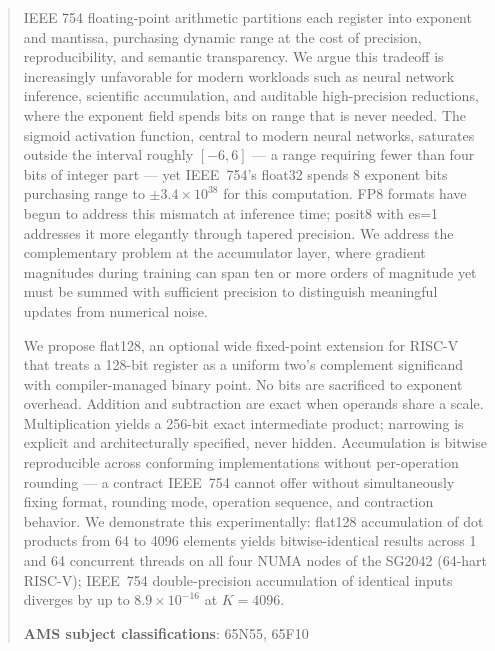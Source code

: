 \documentclass[runningheads]{llncs}
\begin{document}
\begin{abstract}
IEEE 754 floating-point arithmetic partitions each register into exponent
and mantissa, purchasing dynamic range at the cost of precision,
reproducibility, and semantic transparency. We argue this tradeoff is
increasingly unfavorable for modern workloads such as neural network
inference, scientific accumulation, and auditable high-precision
reductions, where the exponent field spends bits on range that is never
needed. The sigmoid activation function, central to modern neural
networks, saturates outside the interval roughly $[-6, 6]$ --- a range
requiring fewer than four bits of integer part --- yet IEEE~754's
float32 spends 8 exponent bits purchasing range to $\pm3.4\times10^{38}$
for this computation. FP8 formats have begun to address this mismatch at
inference time; posit8 with es=1 addresses it more elegantly through
tapered precision. We address the complementary problem at the
accumulator layer, where gradient magnitudes during training can span ten
or more orders of magnitude yet must be summed with sufficient precision
to distinguish meaningful updates from numerical noise.

We propose flat128, an optional wide fixed-point extension for RISC-V
that treats a 128-bit register as a uniform two's complement significand
with compiler-managed binary point. No bits are sacrificed to exponent
overhead. Addition and subtraction are exact when operands share a scale.
Multiplication yields a 256-bit exact intermediate product; narrowing is
explicit and architecturally specified, never hidden. Accumulation is
bitwise reproducible across conforming implementations without
per-operation rounding --- a contract IEEE~754 cannot offer without
simultaneously fixing format, rounding mode, operation sequence, and
contraction behavior. We demonstrate this experimentally: flat128
accumulation of dot products from 64 to 4096 elements yields
bitwise-identical results across 1 and 64 concurrent threads on all four
NUMA nodes of the SG2042 (64-hart RISC-V); IEEE~754 double-precision
accumulation of identical inputs diverges by up to $8.9\times10^{-16}$
at $K=4096$.


\textbf{AMS subject classifications}: {65N55, 65F10}
\end{abstract}


\def\fp#1{\texttt{Float#1}}
\def\bf{\texttt{BFloat16}}
\def\p#1{\texttt{Posit#1}}
\end{document}
